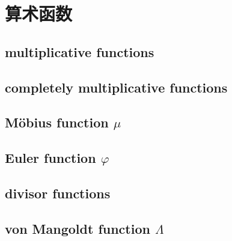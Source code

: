\section{算术函数}
\label{b3:sec:2501}


\subsection{multiplicative functions}
\label{b3:subsec:250101}

\subsection{completely multiplicative functions}
\label{b3:subsec:250102}

\subsection{Möbius function \texorpdfstring{\(\mu\)}{μ}}
\label{b3:subsec:250103}

\subsection{Euler function \texorpdfstring{\(\varphi\)}{m}}
\label{b3:subsec:250104}

\subsection{divisor functions}
\label{b3:subsec:250105}

\subsection{von Mangoldt function \texorpdfstring{\(\Lambda\)}{m}}
\label{b3:subsec:250106}



